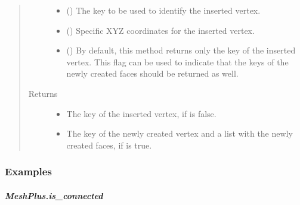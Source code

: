 \documentclass[letterpaper,10pt,english]{sphinxmanual}
\begin{document}
\begin{fulllineitems}
\begin{fulllineitems}
\begin{quote}
\begin{description}
\begin{itemize}
\item {} 
 () \textendash{} The key to be used to identify the inserted vertex.

\item {} 
 () \textendash{} Specific XYZ coordinates for the inserted vertex.

\item {} 
 () \textendash{} By default, this method returns only the key of the inserted vertex.
This flag can be used to indicate that the keys of the newly created
faces should be returned as well.

\end{itemize}

\item[{Returns}] \leavevmode
\begin{itemize}
\item {} 
 \textendash{} The key of the inserted vertex, if  is false.

\item {} 
 \textendash{} The key of the newly created vertex
and a list with the newly created faces, if  is true.

\end{itemize}


\end{description}\end{quote}
\subsubsection*{Examples}

\begin{sphinxVerbatim}[commandchars=\\\{\}]
\end{sphinxVerbatim}

\end{fulllineitems}



\subparagraph{MeshPlus.is\_connected}
\label{\detokenize{api/generated/directional_clustering.mesh.MeshPlus.is_connected:meshplus-is-connected}}\label{\detokenize{api/generated/directional_clustering.mesh.MeshPlus.is_connected::doc}}


\end{fulllineitems}
\end{document}

